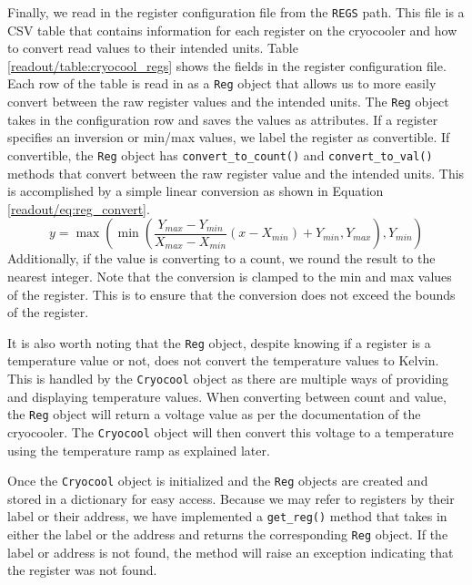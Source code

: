 Finally, we read in the register configuration file from the \texttt{REGS} path.
This file is a CSV table that contains information for each register on the cryocooler and how to convert read values to their intended units. 
Table \ref{readout/table:cryocool_regs} shows the fields in the register configuration file.
Each row of the table is read in as a \texttt{Reg} object that allows us to more easily convert between the raw register values and the intended units.
The \texttt{Reg} object takes in the configuration row and saves the values as attributes.
If a register specifies an inversion or min/max values, we label the register as convertible. 
If convertible, the \texttt{Reg} object has \texttt{convert\_to\_count()} and \texttt{convert\_to\_val()} methods that convert between the raw register value and the intended units.
This is accomplished by a simple linear conversion as shown in Equation \ref{readout/eq:reg_convert}.
\begin{equation}
    \label{readout/eq:reg_convert}
    y = \max\left(\min\left(\frac{Y_{max} - Y_{min}}{X_{max} - X_{min}}\left(x - X_{min}\right) + Y_{min}, Y_{max}\right), Y_{min}\right)
\end{equation}
Additionally, if the value is converting to a count, we round the result to the nearest integer.
Note that the conversion is clamped to the min and max values of the register. 
This is to ensure that the conversion does not exceed the bounds of the register.

It is also worth noting that the \texttt{Reg} object, despite knowing if a register is a temperature value or not, does not convert the temperature values to Kelvin.
This is handled by the \texttt{Cryocool} object as there are multiple ways of providing and displaying temperature values.
When converting between count and value, the \texttt{Reg} object will return a voltage value as per the documentation of the cryocooler.
The \texttt{Cryocool} object will then convert this voltage to a temperature using the temperature ramp as explained later. 

Once the \texttt{Cryocool} object is initialized and the \texttt{Reg} objects are created and stored in a dictionary for easy access.
Because we may refer to registers by their label or their address, we have implemented a \texttt{get\_reg()} method that takes in either the label or the address and returns the corresponding \texttt{Reg} object.
If the label or address is not found, the method will raise an exception indicating that the register was not found.

